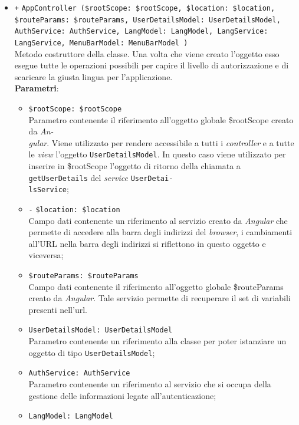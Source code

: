 \begin{itemize}
		\begin{itemize}
		\item \texttt{+} \texttt{AppController (\$rootScope: \$rootScope, \$location: \$location, \$routeParams: \$routeParams, UserDetailsModel: UserDetailsModel, AuthService: AuthService, LangModel: LangModel, LangService: LangService, MenuBarModel: MenuBarModel )} \\ Metodo costruttore della classe. Una volta che viene creato l'oggetto esso esegue tutte le operazioni possibili per capire il livello di autorizzazione e di scaricare la giusta lingua per l'applicazione.\\
		\textbf{Parametri}: 
		\begin{itemize}
			\item \texttt{\$rootScope: \$rootScope} \\
			Parametro contenente il riferimento all'oggetto globale \$rootScope creato da \textit{An-\\gular{}}. Viene utilizzato per rendere accessibile a tutti i \textit{controller} e a tutte le \textit{view} l'oggetto \texttt{UserDetailsModel}. In questo caso viene utilizzato per inserire in \$rootScope l'oggetto di ritorno della chiamata a \texttt{getUserDetails} del \textit{service} \texttt{UserDetai-\\lsService};
			\item \texttt{-} \texttt{\$location: \$location} \\
			Campo dati contenente un riferimento al servizio creato da \textit{Angular} che permette di accedere alla barra degli indirizzi del \textit{browser}, i cambiamenti all'URL nella barra degli indirizzi si riflettono in questo oggetto e viceversa; 
			\item \texttt{\$routeParams: \$routeParams} \\
			Campo dati contenente il riferimento all'oggetto globale \$routeParams creato da \textit{Angular}. Tale servizio permette di recuperare il set di variabili presenti nell'url.
			\item \texttt{UserDetailsModel: UserDetailsModel} \\
			Parametro contenente un riferimento alla classe per poter istanziare un oggetto di tipo \texttt{UserDetailsModel};
			\item \texttt{AuthService: AuthService} \\
			Parametro contenente un riferimento al servizio che si occupa della gestione delle informazioni legate all’autenticazione;
			\item \texttt{LangModel: LangModel} \\

\end{itemize}
\end{itemize}
\end{itemize}
